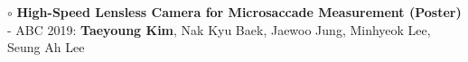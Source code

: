 \documentclass[a4paper,9pt]{extarticle}
\begin{document}
\begin{spacing}{1.05}
\noindent $\circ$ \textbf{High-Speed Lensless Camera for Microsaccade Measurement (Poster)} \\
- ABC 2019: \textbf{Taeyoung Kim}, Nak Kyu Baek, Jaewoo Jung, Minhyeok Lee, Seung Ah Lee










\end{spacing}
\end{document}
